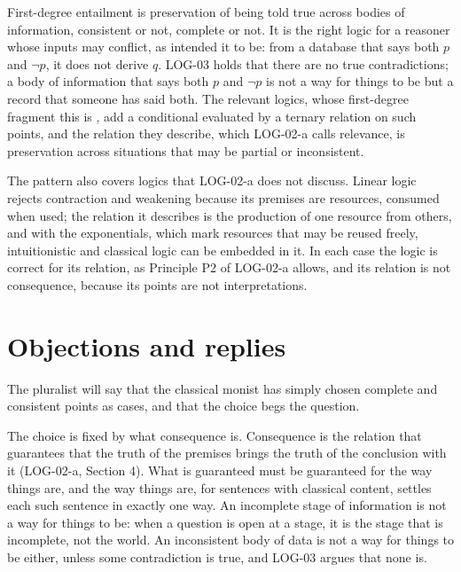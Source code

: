 \documentclass{situationist-preprint}
\begin{document}
First-degree entailment is preservation of being told true across bodies of information, consistent or not, complete or not. It is the right logic for a reasoner whose inputs may conflict, as \citet{Belnap1977} intended it to be: from a database that says both $p$ and $\neg p$, it does not derive $q$. LOG-03 holds that there are no true contradictions; a body of information that says both $p$ and $\neg p$ is not a way for things to be but a record that someone has said both. The relevant logics, whose first-degree fragment this is \citep{AndersonBelnap1975}, add a conditional evaluated by a ternary relation on such points, and the relation they describe, which LOG-02-a calls relevance, is preservation across situations that may be partial or inconsistent.

The pattern also covers logics that LOG-02-a does not discuss. Linear logic \citep{Girard1987} rejects contraction and weakening because its premises are resources, consumed when used; the relation it describes is the production of one resource from others, and with the exponentials, which mark resources that may be reused freely, intuitionistic and classical logic can be embedded in it. In each case the logic is correct for its relation, as Principle P2 of LOG-02-a allows, and its relation is not consequence, because its points are not interpretations.

\section{Objections and replies}

\begin{objection}
The pluralist will say that the classical monist has simply chosen complete and consistent points as cases, and that the choice begs the question.
\end{objection}

\begin{reply}
The choice is fixed by what consequence is. Consequence is the relation that guarantees that the truth of the premises brings the truth of the conclusion with it (LOG-02-a, Section 4). What is guaranteed must be guaranteed for the way things are, and the way things are, for sentences with classical content, settles each such sentence in exactly one way. An incomplete stage of information is not a way for things to be: when a question is open at a stage, it is the stage that is incomplete, not the world. An inconsistent body of data is not a way for things to be either, unless some contradiction is true, and LOG-03 argues that none is.
\end{reply}
\end{document}
